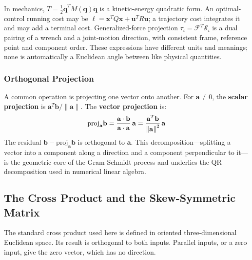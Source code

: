In mechanics, $T=\frac12\dot{\mathbf q}^TM(\mathbf q)\dot{\mathbf q}$ is a kinetic-energy quadratic form. An optimal-control running cost may be $\ell=\mathbf x^TQ\mathbf x+\mathbf u^TR\mathbf u$; a trajectory cost integrates it and may add a terminal cost. Generalized-force projection $\tau_i=\mathcal F^T\mathcal S_i$ is a dual pairing of a wrench and a joint-motion direction, with consistent frame, reference point and component order. These expressions have different units and meanings; none is automatically a Euclidean angle between like physical quantities.

\subsubsection{Orthogonal Projection}

A common operation is projecting one vector onto another. For $\mathbf a\ne0$, the \textbf{scalar projection} is $\mathbf a^T\mathbf b/\|\mathbf a\|$. The \textbf{vector projection} is:
\begin{equation}
    \text{proj}_{\mathbf{a}} \mathbf{b} = \frac{\mathbf{a} \cdot \mathbf{b}}{\mathbf{a} \cdot \mathbf{a}} \, \mathbf{a} = \frac{\mathbf{a}^T \mathbf{b}}{\left\lVert \mathbf{a} \right\rVert^2} \, \mathbf{a}
\end{equation}
The residual $\mathbf{b} - \text{proj}_{\mathbf{a}} \mathbf{b}$ is orthogonal to $\mathbf{a}$. This decomposition---splitting a vector into a component along a direction and a component perpendicular to it---is the geometric core of the Gram-Schmidt process and underlies the QR decomposition used in numerical linear algebra.

\subsection{The Cross Product and the Skew-Symmetric Matrix}
\label{subsec:cross_product}

The standard cross product used here is defined in oriented three-dimensional Euclidean space. Its result is orthogonal to both inputs. Parallel inputs, or a zero input, give the zero vector, which has no direction.

